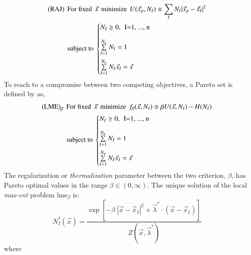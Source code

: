 \documentclass[preprint,12pt,a4paper]{elsarticle}
\begin{document}
\begin{align*}
  \text{(RAJ)} \hspace{0.15cm} &\text{For fixed} \hspace{0.15cm}
  \vec{x} \hspace{0.15cm} \text{minimize} \hspace{0.15cm} U(\vec{x}_p,N_I) \equiv
\sum_I N_I |\vec{x}_p - \vec{x}_I |^2\\
  &\text{subject to}\
  \begin{cases}
    N_I \ge 0, \hspace{0.15cm} \text{I=1, ..., n} \\[1em]   
    \sum\limits_{I=1}^{N_n}{N_I} = 1 \\[1em]   
    \sum\limits_{I=1}^{N_n}{N_I \vec{x}_I} = \vec{x} \\
  \end{cases}
\end{align*}
To reach to a compromise between two competing objectives, a Pareto set is defined by \cite{Arroyo2006} as,
\begin{align*}
  \text{(LME)}_{\beta} \hspace{0.15cm} &\text{For fixed} \hspace{0.15cm}
  \vec{x} \hspace{0.15cm} \text{minimize} \hspace{0.15cm} f_{\beta}(\vec{x}, N_I) \equiv \beta U(\vec{x},N_I) - H(N_I) \\
  &\text{subject to}\
  \begin{cases}
    N_I \ge 0, \hspace{0.15cm} \text{I=1, ..., n} \\[1em]   
    \sum\limits_{I=1}^{N_n}{N_I} = 1 \\[1em]   
    \sum\limits_{I=1}^{N_n}{N_I \vec{x}_I} = \vec{x} \\
  \end{cases}
\end{align*}
The regularization or \textit{thermalization} parameter
between the two criterion, $\beta$, has Pareto optimal values in the range
$\beta \in (0,\infty)$. The unique solution of
the local \textit{max-ent} problem \acrshort{lme}$_\beta$ is:
\begin{equation}
  \label{eq:LME-p}
N_I^*(\vec{x})=\frac{\exp\left[ -\beta \; |\vec{x}-\vec{x}_I|^2 +
    \vec{\lambda}^* \cdot (\vec{x}-\vec{x}_I) \right] } {Z(\vec{x},\vec{\lambda}^*)}
\end{equation}
where
\end{document}
